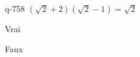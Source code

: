 \begin{truefalse}{q-758}
$(\sqrt{2}+2)(\sqrt{2}-1)=\sqrt{2}$
\item* Vrai
\item Faux
\end{truefalse}

